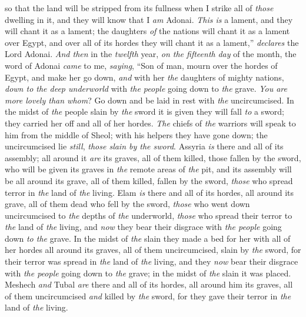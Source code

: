 \begin{biblechapter}
so that the land will be stripped from its fullness 
when I strike all of \textit{those} dwelling in it, 
and they will know that I \textit{am} Adonai.
\verse \textit{This is} a lament, and they will chant it as a lament; the daughters \textit{of} the nations will chant it as a lament over Egypt, and over all of its hordes they will chant it as a lament,” \textit{declares} the Lord Adonai.
\verse \textit{And then} in the \textit{twelfth} year, \textit{on the fifteenth} \textit{day} of the month, the word of Adonai \textit{came} to me, \textit{saying},
\verse “Son of man, mourn over the hordes of Egypt, and make her go down, \textit{and} with her \textit{the} daughters of mighty nations, \textit{down to the deep underworld} with \textit{the people} going down to \textit{the} grave.
\verse \textit{You are more lovely than whom}? Go down and be laid in rest with \textit{the} uncircumcised.
\verse In the midst of \textit{the} people slain by \textit{the} sword it is given they will fall \textit{to} a sword; they carried her off and all of her hordes.
\verse \textit{The} chiefs of \textit{the} warriors will speak to him from the middle of Sheol; with his helpers they have gone down; the uncircumcised lie \textit{still}, \textit{those slain by the sword}.
\verse Assyria \textit{is} there and all of its assembly; all around it \textit{are} its graves, all of them killed, those fallen by the sword,
\verse who will be given its graves in \textit{the} remote areas of \textit{the} pit, and its assembly will be all around its grave, all of them killed, fallen by the sword, \textit{those} who spread terror in \textit{the} land of \textit{the} living.
\verse Elam \textit{is} there and all of its hordes, all around its grave, all of them dead who fell by the sword, \textit{those} who went down uncircumcised to \textit{the} depths of \textit{the} underworld, \textit{those} who spread their terror to \textit{the} land of \textit{the} living, and \textit{now} they bear their disgrace with \textit{the people} going down \textit{to the} grave.
\verse In the midst of \textit{the} slain they made a bed for her with all of her hordes all around its graves, all of them uncircumcised, slain by \textit{the} sword, for their terror was spread in \textit{the} land of \textit{the} living, and they \textit{now} bear their disgrace with \textit{the people} going down to \textit{the} grave; in the midst of \textit{the} slain it was placed.
\verse Meshech \textit{and} Tubal \textit{are} there and all of its hordes, all around him its graves, all of them uncircumcised \textit{and} killed by \textit{the} sword, for they gave their terror in \textit{the} land of \textit{the} living.

\end{biblechapter}
